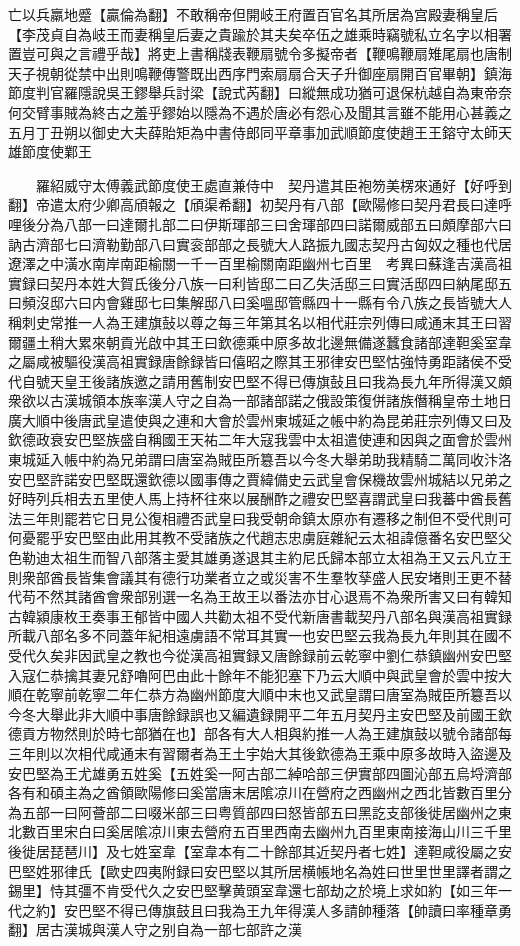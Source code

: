 亡以兵羸地蹙【贏倫為翻】不敢稱帝但開岐王府置百官名其所居為宫殿妻稱皇后【李茂貞自為岐王而妻稱皇后妻之貴踰於其夫矣卒伍之雄乘時竊號私立名字以相署置豈可與之言禮乎哉】將吏上書稱牋表鞭扇號令多擬帝者【鞭鳴鞭扇雉尾扇也唐制天子視朝從禁中出則鳴鞭傳警既出西序門索扇扇合天子升御座扇開百官畢朝】鎮海節度判官羅隱說吳王鏐舉兵討梁【說式芮翻】曰縱無成功猶可退保杭越自為東帝奈何交臂事賊為終古之羞乎鏐始以隱為不遇於唐必有怨心及聞其言雖不能用心甚義之　五月丁丑朔以御史大夫薛貽矩為中書侍郎同平章事加武順節度使趙王王鎔守太師天雄節度使鄴王

　　羅紹威守太傅義武節度使王處直兼侍中　契丹遣其臣袍笏美楞來通好【好呼到翻】帝遣太府少卿高頎報之【頎渠希翻】初契丹有八部【歐陽修曰契丹君長曰達呼哩後分為八部一曰達爾扎部二曰伊斯琿部三曰舍琿部四曰諾爾威部五曰頗摩部六曰訥古濟部七曰濟勒勤部八曰實衮部部之長號大人路振九國志契丹古匈奴之種也代居遼澤之中潢水南岸南距榆關一千一百里榆關南距幽州七百里　考異曰蘇逢吉漢高祖實録曰契丹本姓大賀氏後分八族一曰利皆邸二曰乙失活邸三曰實活邸四曰納尾邸五曰頻沒邸六曰内會雞邸七曰集解邸八曰奚嗢邸管縣四十一縣有令八族之長皆號大人稱刺史常推一人為王建旗鼔以尊之每三年第其名以相代莊宗列傳曰咸通末其王曰習爾疆土稍大累來朝貢光啟中其王曰欽德乘中原多故北邊無備遂蠶食諸部達靼奚室韋之屬咸被驅役漢高祖實録唐餘録皆曰僖昭之際其王邪律安巴堅怙強恃勇距諸侯不受代自號天皇王後諸族邀之請用舊制安巴堅不得已傳旗鼔且曰我為長九年所得漢又頗衆欲以古漢城領本族率漢人守之自為一部諸部諾之俄設策復併諸族僭稱皇帝土地日廣大順中後唐武皇遣使與之連和大會於雲州東城延之帳中約為昆弟莊宗列傳又曰及欽德政衰安巴堅族盛自稱國王天祐二年大寇我雲中太祖遣使連和因與之面會於雲州東城延入帳中約為兄弟謂曰唐室為賊臣所簒吾以今冬大舉弟助我精騎二萬同收汴洛安巴堅許諾安巴堅既還欽德以國事傳之賈緯備史云武皇會保機故雲州城結以兄弟之好時列兵相去五里使人馬上持杯往來以展酬酢之禮安巴堅喜謂武皇曰我蕃中酋長舊法三年則罷若它日見公復相禮否武皇曰我受朝命鎮太原亦有遷移之制但不受代則可何憂罷乎安巴堅由此用其教不受諸族之代趙志忠虜庭雜紀云太祖諱億番名安巴堅父色勒迪太祖生而智八部落主愛其雄勇遂退其主約尼氏歸本部立太祖為王又云凡立王則衆部酋長皆集會議其有德行功業者立之或災害不生羣牧孶盛人民安堵則王更不替代苟不然其諸酋會衆部别選一名為王故王以番法亦甘心退焉不為衆所害又曰有韓知古韓潁康枚王奏事王郁皆中國人共勸太祖不受代新唐書載契丹八部名與漢高祖實録所載八部名多不同蓋年紀相遠虜語不常耳其實一也安巴堅云我為長九年則其在國不受代久矣非因武皇之教也今從漢高祖實録又唐餘録前云乾寧中劉仁恭鎮幽州安巴堅入寇仁恭擒其妻兄舒嚕阿巴由此十餘年不能犯塞下乃云大順中與武皇會於雲中按大順在乾寧前乾寧二年仁恭方為幽州節度大順中末也又武皇謂曰唐室為賊臣所簒吾以今冬大舉此非大順中事唐餘録誤也又編遺録開平二年五月契丹主安巴堅及前國王欽德貢方物然則於時七部猶在也】部各有大人相與約推一人為王建旗鼓以號令諸部每三年則以次相代咸通末有習爾者為王土宇始大其後欽德為王乘中原多故時入盜邊及安巴堅為王尤雄勇五姓奚【五姓奚一阿古部二綽哈部三伊實部四圖沁部五烏埒濟部各有和碩主為之酋領歐陽修曰奚當唐末居隂凉川在營府之西幽州之西北皆數百里分為五部一曰阿薈部二曰啜米部三曰粤質部四曰怒皆部五曰黑訖支部後徙居幽州之東北數百里宋白曰奚居隂凉川東去營府五百里西南去幽州九百里東南接海山川三千里後徙居琵琶川】及七姓室韋【室韋本有二十餘部其近契丹者七姓】達靼咸役屬之安巴堅姓邪律氏【歐史四夷附録曰安巴堅以其所居横帳地名為姓曰世里世里譯者謂之錫里】恃其彊不肯受代久之安巴堅擊黄頭室韋還七部劫之於境上求如約【如三年一代之約】安巴堅不得已傳旗鼓且曰我為王九年得漢人多請帥種落【帥讀曰率種章勇翻】居古漢城與漢人守之别自為一部七部許之漢